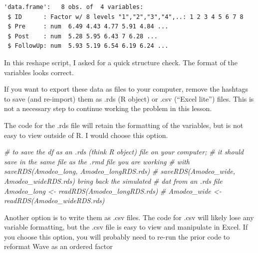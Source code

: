 \documentclass[
  11pt,
]{book}
\newenvironment{Shaded}{\begin{snugshade}}{\end{snugshade}}
\newcommand{\CommentTok}[1]{\textcolor[rgb]{0.37,0.37,0.37}{\textit{#1}}}
\newcommand{\FunctionTok}[1]{\textcolor[rgb]{0.27,0.27,0.27}{\textbf{#1}}}
\newcommand{\NormalTok}[1]{#1}
\newcommand{\OtherTok}[1]{\textcolor[rgb]{0.37,0.37,0.37}{#1}}
\newcommand{\SpecialCharTok}[1]{\textcolor[rgb]{0.43,0.43,0.43}{\textbf{#1}}}
\begin{document}
\begin{verbatim}
'data.frame':   8 obs. of  4 variables:
 $ ID      : Factor w/ 8 levels "1","2","3","4",..: 1 2 3 4 5 6 7 8
 $ Pre     : num  6.49 4.43 4.77 5.91 4.84 ...
 $ Post    : num  5.28 5.95 6.43 7 6.28 ...
 $ FollowUp: num  5.93 5.19 6.54 6.19 6.24 ...
\end{verbatim}

\begin{Shaded}
\end{Shaded}

In this reshape script, I asked for a quick structure check. The format of the variables looks correct.

If you want to export these data as files to your computer, remove the hashtags to save (and re-import) them as .rds (R object) or .csv (``Excel lite'') files. This is not a necessary step to continue working the problem in this lesson.

The code for the .rds file will retain the formatting of the variables, but is not easy to view outside of R. I would choose this option.

\begin{Shaded}
\begin{Highlighting}[]
\CommentTok{\# to save the df as an .rds (think \textquotesingle{}R object\textquotesingle{}) file on your computer;}
\CommentTok{\# it should save in the same file as the .rmd file you are working}
\CommentTok{\# with saveRDS(Amodeo\_long, \textquotesingle{}Amodeo\_longRDS.rds\textquotesingle{})}
\CommentTok{\# saveRDS(Amodeo\_wide, \textquotesingle{}Amodeo\_wideRDS.rds\textquotesingle{}) bring back the simulated}
\CommentTok{\# dat from an .rds file Amodeo\_long \textless{}{-} readRDS(\textquotesingle{}Amodeo\_longRDS.rds\textquotesingle{})}
\CommentTok{\# Amodeo\_wide \textless{}{-} readRDS(\textquotesingle{}Amodeo\_wideRDS.rds\textquotesingle{})}
\end{Highlighting}
\end{Shaded}

Another option is to write them as .csv files. The code for .csv will likely lose any variable formatting, but the .csv file is easy to view and manipulate in Excel. If you choose this option, you will probably need to re-run the prior code to reformat Wave as an ordered factor
\end{document}
